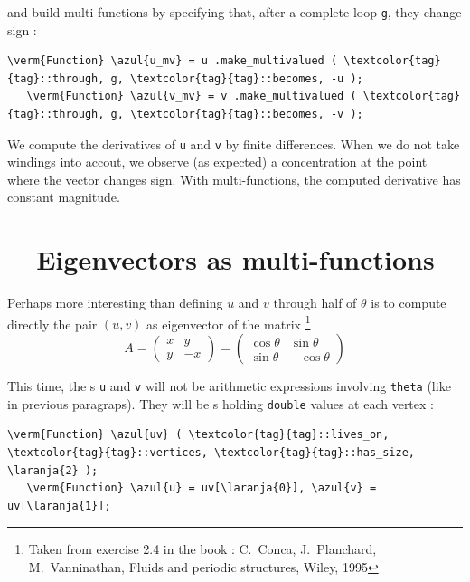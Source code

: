 \noindent and build multi-functions by specifying that, after a complete loop {\small\tt g},
they change sign :

\begin{Verbatim}[commandchars=\\\{\},formatcom=\small\tt,frame=single,
   label=parag-\ref{\numb section 7.\numb parag 25}.cpp,rulecolor=\color{moldura},
   baselinestretch=0.94,framesep=2mm                                              ]
   \verm{Function} \azul{u_mv} = u .make_multivalued ( \textcolor{tag}{tag}::through, g, \textcolor{tag}{tag}::becomes, -u );
   \verm{Function} \azul{v_mv} = v .make_multivalued ( \textcolor{tag}{tag}::through, g, \textcolor{tag}{tag}::becomes, -v );
\end{Verbatim}

We compute the derivatives of {\small\tt u} and {\small\tt v} by finite differences.
When we do not take windings into accout, we observe (as expected) a concentration at the point where
the vector changes sign.
With multi-functions, the computed derivative has constant magnitude.


\section{~~Eigenvectors as multi-functions}  \label{\numb section 7.\numb parag 26}

Perhaps more interesting than defining $u$ and $v$ through half of $ \theta $ is to compute directly
the pair $ (u,v) $ as eigenvector of the matrix
\footnote {{} Taken from exercise 2.4 in the book : C.\ Conca, J.\ Planchard,
M.\ Vanninathan, Fluids and periodic structures, Wiley, 1995}
$$ A = \left(\begin{array}{rr} x & y \\ y & -x \end{array}\right)
= \left(\begin{array}{rr} \cos\theta & \sin\theta \\ \sin\theta & -\cos\theta \end{array}\right) $$

This time, the {\small\tt{}}s {\small\tt u} and {\small\tt v} will not be arithmetic
expressions involving {\small\tt theta} (like in previous paragraps).
They will be {\small\tt{}}s holding {\small\tt double} values at each vertex :

\begin{Verbatim}[commandchars=\\\{\},formatcom=\small\tt,frame=single,
   label=parag-\ref{\numb section 7.\numb parag 26}.cpp,rulecolor=\color{moldura},
   baselinestretch=0.94,framesep=2mm                                              ]
   \verm{Function} \azul{uv} ( \textcolor{tag}{tag}::lives_on, \textcolor{tag}{tag}::vertices, \textcolor{tag}{tag}::has_size, \laranja{2} );
   \verm{Function} \azul{u} = uv[\laranja{0}], \azul{v} = uv[\laranja{1}];
\end{Verbatim}

